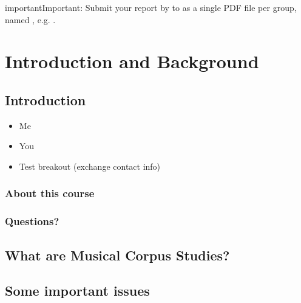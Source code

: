 \documentclass[letterpaper,10pt,english]{sphinxmanual}
\begin{document}
\begin{sphinxadmonition}{important}{Important:}
Submit your report by  to 
as a single PDF file per group, named , e.g. .
\end{sphinxadmonition}


\chapter{Introduction and Background}
\label{\detokenize{02_intro_background:Introduction-and-Background}}\label{\detokenize{02_intro_background::doc}}

\section{Introduction}
\label{\detokenize{02_intro_background:Introduction}}\begin{itemize}
\item {} 
Me

\item {} 
You

\item {} 
Test breakout (exchange contact info)

\end{itemize}


\subsection{About this course}
\label{\detokenize{02_intro_background:About-this-course}}

\subsection{Questions?}
\label{\detokenize{02_intro_background:Questions?}}

\section{What are Musical Corpus Studies?}
\label{\detokenize{02_intro_background:What-are-Musical-Corpus-Studies?}}

\section{Some important issues}
\label{\detokenize{02_intro_background:Some-important-issues}}
\end{document}
